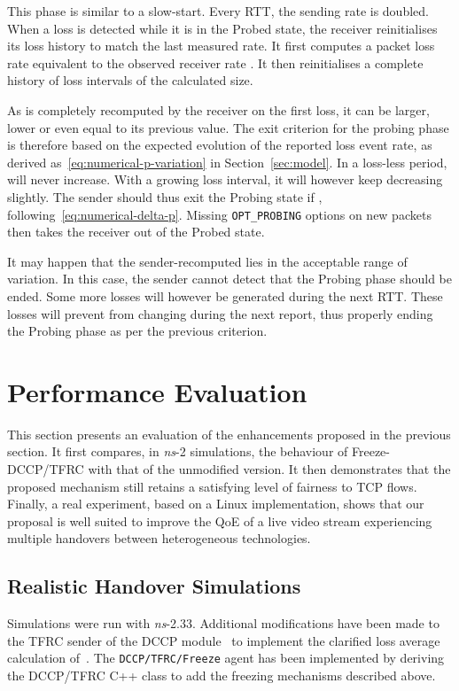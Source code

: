 \documentclass[twocolumn]{nictatechreport}
\newcommand{\ns}{\textit{ns}}
\begin{document}
This phase is similar to a slow-start. Every RTT, the sending rate is
doubled.  When a loss is detected while it is in the Probed state, the receiver
reinitialises its loss history to match the last measured rate. It first
computes a packet loss rate  equivalent to the observed receiver rate
. It then reinitialises a complete history of  loss
intervals of the calculated size.

As  is completely recomputed by the receiver on the first loss, it can be
larger, lower or even equal to its previous value. The exit criterion for the
probing phase is therefore based on the expected evolution of the reported loss
event rate, as derived as~\eqref{eq:numerical-p-variation} in
Section~\ref{sec:model}. In a loss-less period,  will never increase. With a
growing loss interval, it will however keep decreasing slightly. The sender
should thus exit the Probing state if
, 
following~\eqref{eq:numerical-delta-p}. Missing \verb#OPT_PROBING#
options on new packets then takes the receiver out of the Probed state.

It may happen that the sender-recomputed  lies in the acceptable range of
variation. In this case, the sender cannot detect that the Probing phase should
be ended. Some more losses will however be generated during the next RTT. These
losses will prevent  from changing during the next report, thus properly
ending the Probing phase as per the previous criterion.

\section{Performance Evaluation}
\label{freezetfrc:performance}

This section  presents an evaluation of the enhancements proposed in the
previous section. It first compares, in \ns-2 simulations, the behaviour of
Freeze-DCCP/TFRC with that of the unmodified version. It then demonstrates that
the proposed mechanism still retains a satisfying level of fairness to TCP
flows.  Finally, a real experiment, based on a Linux implementation, shows that
our proposal is well suited to improve the QoE of a live video stream
experiencing multiple handovers between heterogeneous technologies.

\subsection{Realistic Handover Simulations}
\label{realistic}

Simulations were run with \ns-2.33. Additional modifications have been made to
the TFRC sender of the DCCP module~\cite{2004mattsson_dccp_ns2} to implement
the clarified loss average calculation of~\cite{rfc5348}. The
\verb#DCCP/TFRC/Freeze# agent has been implemented by deriving the DCCP/TFRC
C++ class to add the freezing mechanisms described above.
\end{document}
